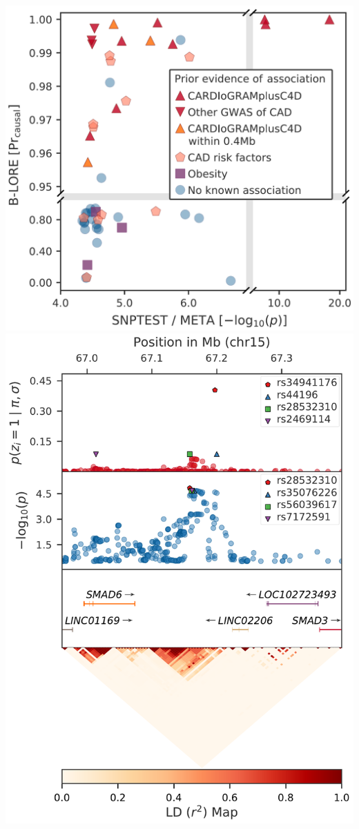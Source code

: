 \documentclass[a0paper,portrait,debug]{baposter}
\begin{document}
\begin{poster}
{  \begin{center}
    \includegraphics[height=\myfigheight, keepaspectratio]{loci_classification.pdf}
    \includegraphics[height=\myfigheight, keepaspectratio]{Locus_018.pdf}

\end{center}}
\end{poster}
\end{document}
